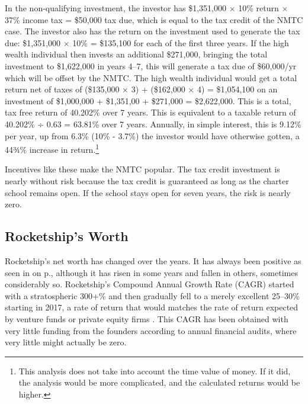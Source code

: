 In the non-qualifying investment, the investor has \$1,351,000 $\times$ 10\% return $\times$ 37\% income tax = \$50,000 tax due, which is equal to the tax credit of the NMTC case. The investor also has the return on the investment used to generate the tax due: \$1,351,000 $\times$ 10\% = \$135,100 for each of the first three years. If the high wealth individual then invests an additional \$271,000, bringing the total investment to \$1,622,000 in years 4–7, this will generate a tax due of \$60,000/yr which will be offset by the NMTC. The high wealth individual would get a total return net of taxes of (\$135,000 $\times$ 3) + (\$162,000 $\times$ 4) = \$1,054,100 on an investment of \$1,000,000 + \$1,351,00 + \$271,000 = \$2,622,000. This is a total, tax free return of 40.202\% over 7 years. This is equivalent to a taxable return of 40.202\% ÷ 0.63 = 63.81\% over 7 years. Annually, in simple interest, this is 9.12\% per year, up from 6.3\% (10\% - 3.7\%) the investor would have otherwise gotten, a 44¾\% increase in return.\footnote{This analysis does not take into account the time value of money. If it did, the analysis would be more complicated, and the calculated returns would be higher.}

Incentives like these make the NMTC popular. The tax credit investment is nearly without risk because the tax credit is guaranteed as long as the charter school remains open. If the school stays open for seven years, the risk is nearly zero.


\subsection{Rocketship's Worth}%
\label{sec:rocketship-worth}\indent%

Rocketship's net worth has changed over the years. It has always been positive as seen in  on p.\pageref{tab:net_assets_annual_change}, although it has risen in some years and fallen in others, sometimes considerably so. Rocketship's Compound Annual Growth Rate (CAGR) started with a stratospheric 300+\% and then gradually fell to a merely excellent 25–30\% starting in 2017, a rate of return that would matches the rate of return expected by venture funds or private equity firms \parencite[87]{Lord.Mirabile2018}. This CAGR has been obtained with very little funding from the founders according to annual financial audits, where very little might actually be zero. 

